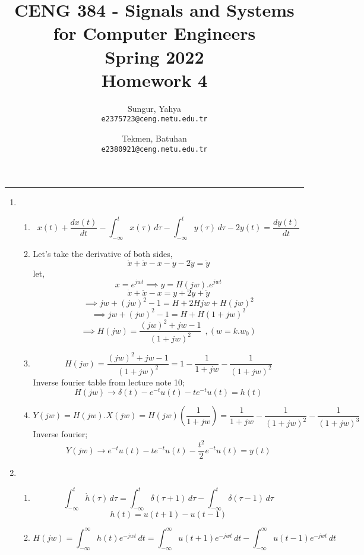 \documentclass[10pt,a4paper, margin=1in]{article}
\author{
  Sungur, Yahya\\
  \texttt{e2375723@ceng.metu.edu.tr}
  \and
  Tekmen, Batuhan\\
  \texttt{e2380921@ceng.metu.edu.tr}
}
\title{CENG 384 - Signals and Systems for Computer Engineers \\
Spring 2022 \\
Homework 4}
\begin{document}
\maketitle



\noindent\rule{19cm}{1.2pt}

\begin{enumerate}

\item %
    \begin{enumerate}
    \item %
        $$ x(t) + \frac{dx(t)}{dt} - \int_{-\infty}^{t} x(\tau) \,d\tau - \int_{-\infty}^{t} y(\tau) \,d\tau  -2y(t) = \frac{dy(t)}{dt}$$
    \item %
        Let's take the derivative of both sides,
        $$ \dot{x} + \ddot{x} -x - y - 2\dot{y} = \ddot{y} $$
        let, 
        $$ x = e^{jwt} \implies y = H(jw).e^{jwt} $$
        $$ \dot{x} + \ddot{x} -x = y + 2\dot{y} + \ddot{y} $$
        $$ \implies jw + (jw)^2 -1 = H + 2Hjw + H(jw)^2 $$
        $$ \implies jw + (jw)^2 -1 = H + H(1+jw)^2 $$
        $$ \implies H(jw) = \frac{(jw)^2 + jw -1}{(1+jw)^2} \ \ ,(w = k.w_0) $$
    \item %
        $$ H(jw) = \frac{(jw)^2 + jw -1}{(1+jw)^2} = 1 - \frac{1}{1+jw} - \frac{1}{(1+jw)^2} $$
        Inverse fourier table from lecture note 10;
        $$ H(jw) \longrightarrow \delta(t) - e^{-t}u(t) - te^{-t}u(t) = h(t)  $$
    \item %
        $$ Y(jw) = H(jw).X(jw) = H(jw)(\frac{1}{1+jw}) = \frac{1}{1+jw} - \frac{1}{(1+jw)^2} - \frac{1}{(1+jw)^3} $$
        Inverse fourier;
        $$ Y(jw) \longrightarrow e^{-t}u(t) - te^{-t}u(t) - \frac{t^2}{2}e^{-t}u(t) = y(t) $$
    \end{enumerate}
\hline
\item %
    \begin{enumerate}
    \item %
        $$ \int_{-\infty}^{t} \dot{h}(\tau) \,d\tau = \int_{-\infty}^{t} \delta(\tau+1) \,d\tau  -\int_{-\infty}^{t} \delta(\tau-1) \,d\tau $$
        $$ h(t) = u(t+1) - u(t-1) $$
    \item %
        $$ H(jw) = \int_{-\infty}^{\infty} h(t)e^{-jwt} \,dt = \int_{-\infty}^{\infty} u(t+1)e^{-jwt} \,dt  - \int_{-\infty}^{\infty} u(t-1)e^{-jwt} \,dt$$

\end{enumerate}
\end{enumerate}
\end{document}
